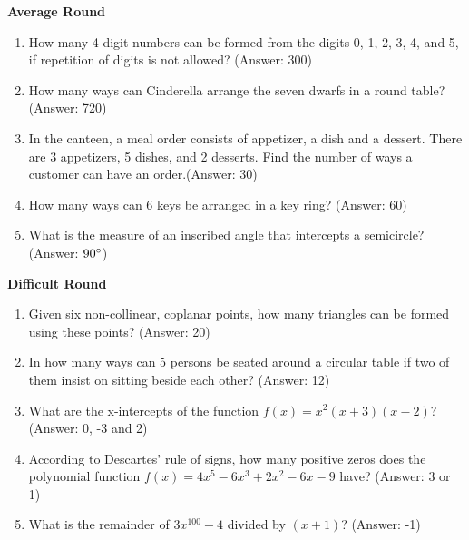 \textbf{Average Round} 
\begin{enumerate}[label = \arabic*. ]
\item How many 4-digit numbers can be formed from the digits 0, 1, 2, 3, 4, and 5, if repetition of digits is not allowed? (Answer: 300)
\item How many ways can Cinderella arrange the seven dwarfs in a round table? (Answer: 720) 
\item In the canteen, a meal order consists of appetizer, a dish and a dessert. There are 3 appetizers, 5 dishes, and 2 desserts. Find the number of ways a customer can have an order.(Answer: 30)
\item How many ways can 6 keys be arranged in a key ring? (Answer: 60)
\item What is the measure of an inscribed angle that intercepts a semicircle? (Answer: $90 \degree$)
\end{enumerate} 

\textbf{Difficult Round} 
\begin{enumerate}[label = \arabic*. ]
\item Given six non-collinear, coplanar points, how many triangles can be formed using these points? (Answer: 20)
\item In  how  many  ways  can 5  persons  be  seated  around  a  circular  table  if two  of  them  insist  on  sitting  beside  each  other? (Answer: 12)
\item What are the x-intercepts of the function \mbox{$f(x) = x^2 (x +3)(x -2)$}? (Answer: 0, -3 and 2)
\item According to Descartes' rule of signs, how many positive zeros does  the polynomial function $f(x) = 4x^5-6x^3 + 2x^2-6x-9$ have? (Answer: 3 or 1)
\item What is the remainder of  $3x^{100} - 4$  divided by $(x + 1)$?  (Answer: -1)
\end{enumerate} 

